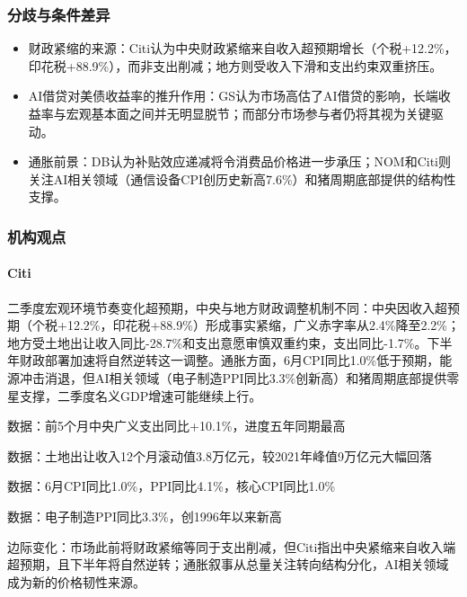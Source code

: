 \documentclass[11pt]{ctexart}
\begin{document}
\subsubsection*{分歧与条件差异}
\begin{itemize}
  \item 财政紧缩的来源：Citi认为中央财政紧缩来自收入超预期增长（个税+12.2\%，印花税+88.9\%），而非支出削减；地方则受收入下滑和支出约束双重挤压。
  \item AI借贷对美债收益率的推升作用：GS认为市场高估了AI借贷的影响，长端收益率与宏观基本面之间并无明显脱节；而部分市场参与者仍将其视为关键驱动。
  \item 通胀前景：DB认为补贴效应递减将令消费品价格进一步承压；NOM和Citi则关注AI相关领域（通信设备CPI创历史新高7.6\%）和猪周期底部提供的结构性支撑。
\end{itemize}
\subsubsection*{机构观点}
\paragraph{Citi} 二季度宏观环境节奏变化超预期，中央与地方财政调整机制不同：中央因收入超预期（个税+12.2\%，印花税+88.9\%）形成事实紧缩，广义赤字率从2.4\%降至2.2\%；地方受土地出让收入同比-28.7\%和支出意愿审慎双重约束，支出同比-1.7\%。下半年财政部署加速将自然逆转这一调整。通胀方面，6月CPI同比1.0\%低于预期，能源冲击消退，但AI相关领域（电子制造PPI同比3.3\%创新高）和猪周期底部提供零星支撑，二季度名义GDP增速可能继续上行。
{\small\color{refgray}数据：前5个月中央广义支出同比+10.1\%，进度五年同期最高\par}
{\small\color{refgray}数据：土地出让收入12个月滚动值3.8万亿元，较2021年峰值9万亿元大幅回落\par}
{\small\color{refgray}数据：6月CPI同比1.0\%，PPI同比4.1\%，核心CPI同比1.0\%\par}
{\small\color{refgray}数据：电子制造PPI同比3.3\%，创1996年以来新高\par}
{\small\color{refgray}边际变化：市场此前将财政紧缩等同于支出削减，但Citi指出中央紧缩来自收入端超预期，且下半年将自然逆转；通胀叙事从总量关注转向结构分化，AI相关领域成为新的价格韧性来源。\par}
\end{document}
